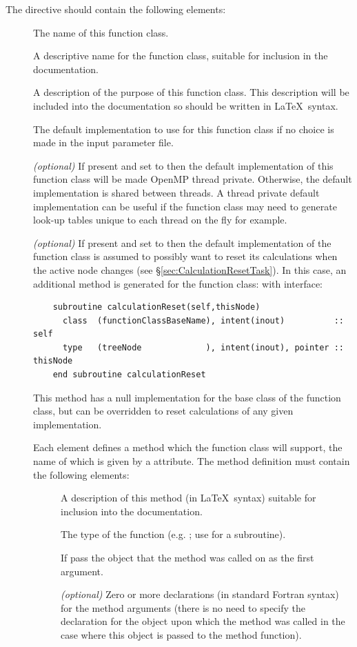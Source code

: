 The directive should contain the following elements:
\begin{description}
\item[] The name of this function class.
\item[] A descriptive name for the function class, suitable for inclusion in the documentation.
\item[] A description of the purpose of this function class. This description will be included into the documentation so should be written in \LaTeX\ syntax.
\item[] The default implementation to use for this function class if no choice is made in the input parameter file.
\item[] \emph{(optional)} If present and set to  then the default implementation of this function class will be made OpenMP thread private. Otherwise, the default implementation is shared between threads. A thread private default implementation can be useful if the function class may need to generate look-up tables unique to each thread on the fly for example.
\item[] \emph{(optional)} If present and set to  then the default implementation of the function class is assumed to possibly want to reset its calculations when the active \gls{node} changes (see \S\ref{sec:CalculationResetTask}). In this case, an additional method is generated for the function class:  with interface:
  \begin{lstlisting}
    subroutine calculationReset(self,thisNode)
      class  (functionClassBaseName), intent(inout)          :: self
      type   (treeNode             ), intent(inout), pointer :: thisNode
    end subroutine calculationReset
  \end{lstlisting}
  This method has a null implementation for the base class of the function class, but can be overridden to reset calculations of any given implementation.
\item[] Each  element defines a method which the function class will support, the name of which is given by a  attribute. The method definition must contain the following elements:
  \begin{description}
  \item[] A description of this method (in \LaTeX\ syntax) suitable for inclusion into the documentation.
  \item[] The type of the function (e.g. ; use  for a subroutine).
  \item[] If  pass the object that the method was called on as the first argument.
  \item[] \emph{(optional)} Zero or more declarations (in standard Fortran syntax) for the method arguments (there is no need to specify the declaration for the object upon which the method was called in the case where this object is passed to the method function).
  \end{description}
\end{description}

